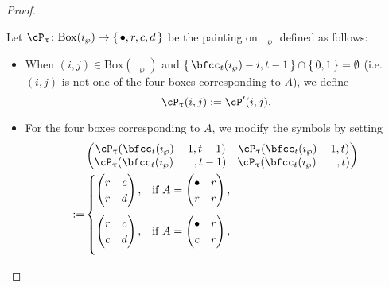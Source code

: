 \documentclass[12pt,a4paper]{amsart}
\numberwithin{equation}{section}
\theoremstyle{remark}
\def\BOX#1{\mathrm{Box}(#1)}
\begin{document}
\begin{proof}
\begin{description}
    Let $\cP_{\uptau}\colon \BOX{\imath_{\wp}}\rightarrow \set{\bullet,r,c,d}$
          be the painting on $\imath_{\wp}$ defined as follows:
          \begin{itemize}
            \item When $(i,j)\in \BOX{\imath_{\wp}}$ and
            $\set{\bfcc_{t}(\imath_{\wp})-i,t-1}\cap\set{0,1}=\emptyset$
            (i.e. $(i,j)$ is not one of the four boxes corresponding to
            $A$), we define
            \[
              \cP_{\uptau}(i,j):= \cP'(i,j).
            \]

            \item For the four boxes corresponding to $A$, we modify the symbols by
            setting
            \begin{equation} \label{eq:modP}
              \begin{split}
                &\begin{pmatrix}
                  \cP_{\uptau}(\bfcc_{t}(\imath_{\wp})-1,t-1) & \cP_{\uptau}(\bfcc_{t}(\imath_{\wp})-1,t) \\
                  \cP_{\uptau}(\bfcc_{t}(\imath_{\wp})\;\phantom{-1}\;,t-1)
                  & \cP_{\uptau}(\bfcc_{t}(\imath_{\wp})\;\phantom{-1}\;,t) \\
                \end{pmatrix}\\
                :=&
                \begin{cases}
                  \begin{pmatrix}
                    r & c\\
                    r & d
                  \end{pmatrix}, & \text{if } A =
                  \begin{pmatrix}
                    \bullet & r\\
                    r & r
                  \end{pmatrix},\\[1.5em]
                  \begin{pmatrix}
                    r & c\\
                    c & d
                  \end{pmatrix}, & \text{if } A =
                  \begin{pmatrix}
                    \bullet & r\\
                    c & r
                  \end{pmatrix},\\[1.5em]

\end{cases}
\end{split}
\end{equation}
\end{itemize}
\end{description}
\end{proof}
\end{document}
